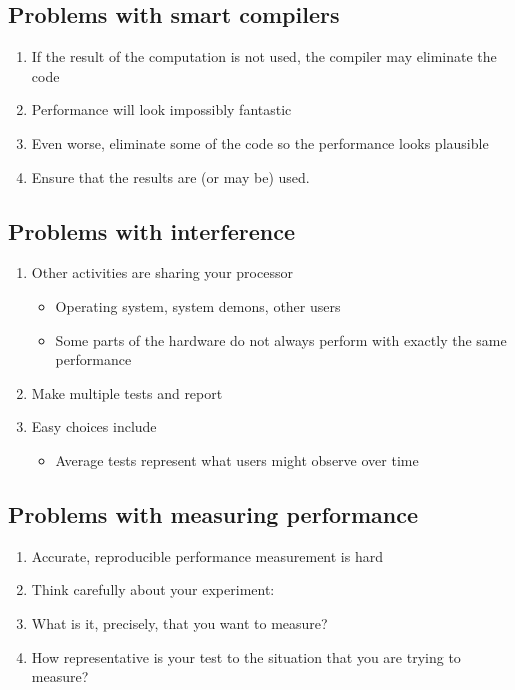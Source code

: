 \documentclass[%
oneside,                 %
final,                   %
10pt]{article}
\begin{document}
\noindent
\subsection*{Problems with smart compilers}

\begin{enumerate}
\item If the result of the computation is not used, the compiler may eliminate the code

\item Performance will look impossibly fantastic

\item Even worse, eliminate some of the code so the performance looks plausible

\item Ensure that the results are (or may be) used.
\end{enumerate}

\noindent
\subsection*{Problems with interference}
\begin{enumerate}
\item Other activities are sharing your processor
\begin{itemize}

  \item Operating system, system demons, other users

  \item Some parts of the hardware do not always perform with exactly the same performance

\end{itemize}

\noindent
\item Make multiple tests and report

\item Easy choices include
\begin{itemize}

  \item Average tests represent what users might observe over time
\end{itemize}

\noindent
\end{enumerate}

\noindent
\subsection*{Problems with measuring performance}
\begin{enumerate}
\item Accurate, reproducible performance measurement is hard

\item Think carefully about your experiment:

\item What is it, precisely, that you want to measure?

\item How representative is your test to the situation that you are trying to measure?
\end{enumerate}
\end{document}

